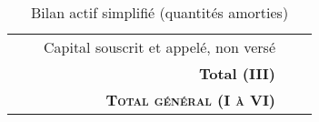 \begin{table}[h]
\begin{tabular}{|l|p{0.2cm}|p{6cm}|c|c|}
    &             &  Capital souscrit et appelé, non versé	                                     &     &   \\ 
\cline{2-5}                                                                                                                                                 
                                                                                     &         \multicolumn{2}{r|}{\textbf{Total (III)}}              &     &   \\                                                                                   
\hline                                                                                                                                                                      
 \multicolumn{3}{|r|}{\textbf{\textsc{Total général (I à VI)}}}  &  & \\
\hline                                                                                                                                                                                                                                                                                                       
\end{tabular}
\label{bilanActif}
\caption{Bilan actif simplifié (quantités amorties)}
\end{table}